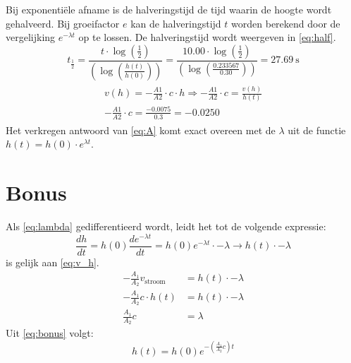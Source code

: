 \documentclass[numbers=endperiod]{scrartcl}
\begin{document}
Bij exponentiële afname is de halveringstijd de tijd waarin de hoogte wordt gehalveerd. Bij groeifactor $e$ kan de halveringstijd $t$ worden berekend door de vergelijking $e^{-\lambda t}$ op te lossen. De halveringstijd wordt weergeven in \cref{eq:half}.
\begin{equation}\label{eq:half}
t_{\frac{1}{2}} = \frac{t \cdot \log(\frac{1}{2})}{\left(\log \left(\frac{h(t)}{h(0)}\right)\right)} = \frac{10.00 \cdot \log(\frac{1}{2})}{\left(\log \left(\frac{0.233567}{0.30}\right)\right)} = \SI{27.69}{\second}
\end{equation}
\begin{align}\label{eq:A}
\begin{split}
v(h) = -\frac{A1}{A2} \cdot c \cdot h \Rightarrow -\frac{A1}{A2} \cdot c =\frac{v(h)}{h(t)}\\
-\frac{A1}{A2} \cdot c = \frac{-0.0075}{0.3} = -0.0250
\end{split}
\end{align}
Het verkregen antwoord van \cref{eq:A} komt exact overeen met de $\lambda$ uit de functie $h(t) = h(0)\cdot e^{\lambda t}$.

\newpage
\section{Bonus}
Als \cref{eq:lambda} gedifferentieerd wordt, leidt het tot de volgende expressie:
    \begin{equation}\label{eq:h_t_afgeleide_exp}
        \frac{dh}{dt} = h(0)\frac{de^{-\lambda t}}{dt} = h(0)e^{-\lambda t}\cdot-\lambda \rightarrow h(t)\cdot-\lambda
    \end{equation}
     is gelijk aan \cref{eq:v_h}.
    \begin{equation}\label{eq:bonus}
        \begin{split}
            -\frac{A_1}{A_2}v_{\text{stroom}} &= h(t)\cdot-\lambda\\
            -\frac{A_1}{A_2}c\cdot h(t) &= h(t)\cdot-\lambda\\
            \frac{A_1}{A_2}c &= \lambda
        \end{split}
    \end{equation}
    Uit \cref{eq:bonus} volgt:
    \begin{equation*}
        h(t) = h(0)e^{-\left(\frac{A_1}{A_2}c\right)t}
    \end{equation*}
    
\end{document}
